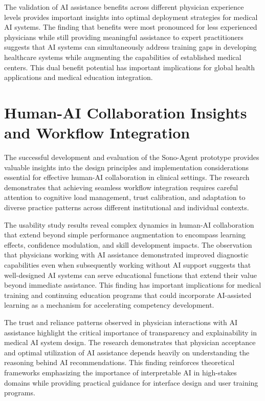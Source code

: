 The validation of AI assistance benefits across different physician experience levels provides important insights into optimal deployment strategies for medical AI systems. The finding that benefits were most pronounced for less experienced physicians while still providing meaningful assistance to expert practitioners suggests that AI systems can simultaneously address training gaps in developing healthcare systems while augmenting the capabilities of established medical centers. This dual benefit potential has important implications for global health applications and medical education integration.

\section{Human-AI Collaboration Insights and Workflow Integration}

The successful development and evaluation of the Sono-Agent prototype provides valuable insights into the design principles and implementation considerations essential for effective human-AI collaboration in clinical settings. The research demonstrates that achieving seamless workflow integration requires careful attention to cognitive load management, trust calibration, and adaptation to diverse practice patterns across different institutional and individual contexts.

The usability study results reveal complex dynamics in human-AI collaboration that extend beyond simple performance augmentation to encompass learning effects, confidence modulation, and skill development impacts. The observation that physicians working with AI assistance demonstrated improved diagnostic capabilities even when subsequently working without AI support suggests that well-designed AI systems can serve educational functions that extend their value beyond immediate assistance. This finding has important implications for medical training and continuing education programs that could incorporate AI-assisted learning as a mechanism for accelerating competency development.

The trust and reliance patterns observed in physician interactions with AI assistance highlight the critical importance of transparency and explainability in medical AI system design. The research demonstrates that physician acceptance and optimal utilization of AI assistance depends heavily on understanding the reasoning behind AI recommendations. This finding reinforces theoretical frameworks emphasizing the importance of interpretable AI in high-stakes domains while providing practical guidance for interface design and user training programs.

